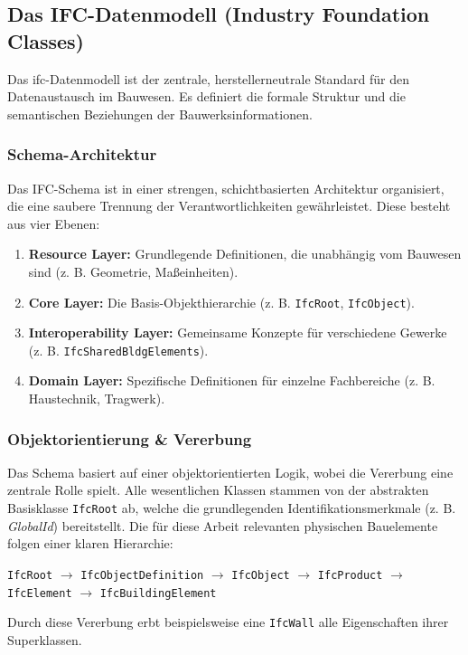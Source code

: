 \subsection{Das IFC-Datenmodell (Industry Foundation Classes)}
\label{subsec:ifc}
Das \gls{ifc}-Datenmodell ist der zentrale, herstellerneutrale Standard für den Datenaustausch im Bauwesen. Es definiert die formale Struktur und die semantischen Beziehungen der Bauwerksinformationen.

\subsubsection{Schema-Architektur}
Das IFC-Schema ist in einer strengen, schichtbasierten Architektur organisiert, die eine saubere Trennung der Verantwortlichkeiten gewährleistet. Diese besteht aus vier Ebenen:
\begin{enumerate}
    \item \textbf{Resource Layer:} Grundlegende Definitionen, die unabhängig vom Bauwesen sind (z. B. Geometrie, Maßeinheiten).
    \item \textbf{Core Layer:} Die Basis-Objekthierarchie (z. B. \texttt{IfcRoot}, \texttt{IfcObject}).
    \item \textbf{Interoperability Layer:} Gemeinsame Konzepte für verschiedene Gewerke (z. B. \texttt{IfcSharedBldgElements}).
    \item \textbf{Domain Layer:} Spezifische Definitionen für einzelne Fachbereiche (z. B. Haustechnik, Tragwerk).
\end{enumerate}

\subsubsection{Objektorientierung \& Vererbung}
Das Schema basiert auf einer objektorientierten Logik, wobei die Vererbung eine zentrale Rolle spielt. Alle wesentlichen Klassen stammen von der abstrakten Basisklasse \texttt{IfcRoot} ab, welche die grundlegenden Identifikationsmerkmale (z. B. \textit{GlobalId}) bereitstellt.
Die für diese Arbeit relevanten physischen Bauelemente folgen einer klaren Hierarchie:
\begin{center}
    \texttt{IfcRoot} $\rightarrow$ \texttt{IfcObjectDefinition} $\rightarrow$ \texttt{IfcObject} $\rightarrow$ \texttt{IfcProduct} $\rightarrow$ \texttt{IfcElement} $\rightarrow$ \texttt{IfcBuildingElement}
\end{center}
Durch diese Vererbung erbt beispielsweise eine \texttt{IfcWall} alle Eigenschaften ihrer Superklassen. 

